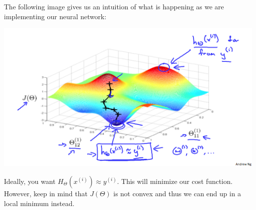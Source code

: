 \documentclass[10pt,a4paper,UTF8]{article}
\begin{document}
The following image gives us an intuition of what is happening as we are implementing our neural network:

\begin{center}
\includegraphics[width=.9\linewidth]{../../img/computer_ng/20171014all.png}
\end{center}

Ideally,  you want \(H_{\Theta}(x^{(i)}) \approx y^{(i)}\). This will minimize our cost function. However, keep in mind that \(J(\Theta)\) is not convex and thus we can end up in a local minimum instead.
\end{document}
